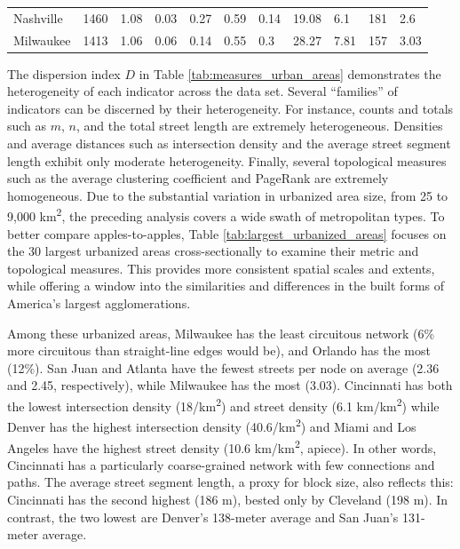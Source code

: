 \documentclass[Afour,sageh,times]{sagej}
\begin{document}
\begin{landscape}
\begin{table}
\begin{tabular}{p{2.5cm} p{1.5cm} p{1.5cm} p{1.5cm} p{1.55cm} p{1.5cm} p{1.5cm} p{1.5cm} p{1.5cm} p{1.5cm} p{1.5cm}}
Nashville            & 1460          & 1.08         & 0.03                       & 0.27           & 0.59        & 0.14        & 19.08                 & 6.1                   & 181                   & 2.6              \\
Milwaukee            & 1413          & 1.06         & 0.06                       & 0.14           & 0.55        & 0.3         & 28.27                 & 7.81                  & 157                   & 3.03 \\
\bottomrule
\end{tabular}
\end{table}
\end{landscape}
\restoregeometry

The dispersion index $D$ in Table \ref{tab:measures_urban_areas} demonstrates the heterogeneity of each indicator across the data set. Several \enquote{families} of indicators can be discerned by their heterogeneity. For instance, counts and totals such as $m$, $n$, and the total street length are extremely heterogeneous. Densities and average distances such as intersection density and the average street segment length exhibit only moderate heterogeneity. Finally, several topological measures such as the average clustering coefficient and PageRank are extremely homogeneous. Due to the substantial variation in urbanized area size, from 25 to 9,000 km\textsuperscript{2}, the preceding analysis covers a wide swath of metropolitan types. To better compare apples-to-apples, Table \ref{tab:largest_urbanized_areas} focuses on the 30 largest urbanized areas cross-sectionally to examine their metric and topological measures. This provides more consistent spatial scales and extents, while offering a window into the similarities and differences in the built forms of America's largest agglomerations. 

Among these urbanized areas, Milwaukee has the least circuitous network (6\% more circuitous than straight-line edges would be), and Orlando has the most (12\%). San Juan and Atlanta have the fewest streets per node on average (2.36 and 2.45, respectively), while Milwaukee has the most (3.03). Cincinnati has both the lowest intersection density (18/km\textsuperscript{2}) and street density (6.1 km/km\textsuperscript{2}) while Denver has the highest intersection density (40.6/km\textsuperscript{2}) and Miami and Los Angeles have the highest street density (10.6 km/km\textsuperscript{2}, apiece). In other words, Cincinnati has a particularly coarse-grained network with few connections and paths. The average street segment length, a proxy for block size, also reflects this: Cincinnati has the second highest (186 m), bested only by Cleveland (198 m). In contrast, the two lowest are Denver's 138-meter average and San Juan's 131-meter average.
\end{document}
